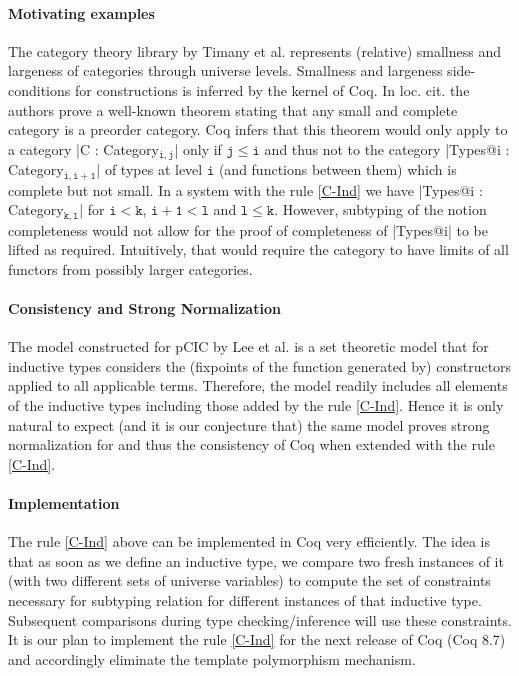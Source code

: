 \documentclass{easychair}
\begin{document}
\paragraph{Motivating examples}
The category theory library by Timany et
al. \cite{DBLP:conf/rta/Timany016} represents (relative) smallness and
largeness of categories through universe levels. Smallness and
largeness side-conditions for constructions is inferred by the kernel
of Coq. In loc. cit. the authors prove a well-known theorem stating
that any small and complete category is a preorder category. Coq
infers that this theorem would only apply to a category
\Coqe|C : Category$_{\mathtt{i, j}}$| only if $\mathtt{j \le i}$ and thus not to
the category \Coqe|Types@{i} : Category$_{\mathtt{i, i + 1}}$| of
types at level $\mathtt{i}$ (and functions between them) which is
complete but not small.  In a system with the rule \ref{C-Ind} we have
\Coqe|Types@{i} : Category$_{\mathtt{k, l}}$| for $\mathtt{i < k}$,
$\mathtt{i + 1 < l}$ and $\mathtt{l \le k}$. However, subtyping of the
notion completeness would not allow for the proof of completeness of
\Coqe|Types@{i}| to be lifted as required. Intuitively, that would
require the category to have limits of all functors from possibly larger
categories.

\paragraph{Consistency and Strong Normalization}
The model constructed for pCIC by Lee et
al. \cite{DBLP:journals/corr/abs-1111-0123} is a set theoretic model
that for inductive types considers the (fixpoints of the function
generated by) constructors applied to all applicable terms. Therefore,
the model readily includes all elements of the inductive types
including those added by the rule \ref{C-Ind}. Hence it is only
natural to expect (and it is our conjecture that) the same model
proves strong normalization for and thus the consistency of Coq when
extended with the rule \ref{C-Ind}.


\paragraph{Implementation}
The rule \ref{C-Ind} above can be implemented in Coq very efficiently.
The idea is that as soon as we define an inductive type, we compare
two fresh instances of it (with two different sets of universe
variables) to compute the set of constraints necessary for subtyping
relation for different instances of that inductive type. Subsequent
comparisons during type checking/inference will use these constraints.
It is our plan to implement the rule \ref{C-Ind} for the next release
of Coq (Coq 8.7) and accordingly eliminate the template polymorphism
mechanism.

\setlength{\bibsep}{0pt} %
\renewcommand{\bibfont}{\small} %


\end{document}
